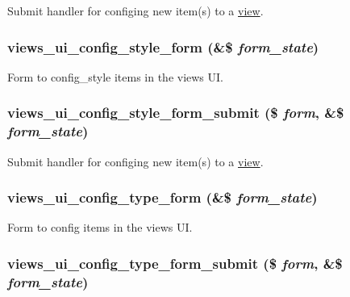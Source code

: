 Submit handler for configing new item(s) to a \hyperlink{classview}{view}. \hypertarget{admin_8inc_9cc05ea6bbc6009482ee71d374c4538e}{
\subsubsection[{views\_\-ui\_\-config\_\-style\_\-form}]{\setlength{\rightskip}{0pt plus 5cm}views\_\-ui\_\-config\_\-style\_\-form (\&\$ {\em form\_\-state})}}
\label{admin_8inc_9cc05ea6bbc6009482ee71d374c4538e}


Form to config\_\-style items in the views UI. \hypertarget{admin_8inc_421a319ebb088e20841e643f67ab1cfe}{
\subsubsection[{views\_\-ui\_\-config\_\-style\_\-form\_\-submit}]{\setlength{\rightskip}{0pt plus 5cm}views\_\-ui\_\-config\_\-style\_\-form\_\-submit (\$ {\em form}, \/  \&\$ {\em form\_\-state})}}
\label{admin_8inc_421a319ebb088e20841e643f67ab1cfe}


Submit handler for configing new item(s) to a \hyperlink{classview}{view}. \hypertarget{admin_8inc_bbebaee3c929f00492cf42bd8cb8db46}{
\subsubsection[{views\_\-ui\_\-config\_\-type\_\-form}]{\setlength{\rightskip}{0pt plus 5cm}views\_\-ui\_\-config\_\-type\_\-form (\&\$ {\em form\_\-state})}}
\label{admin_8inc_bbebaee3c929f00492cf42bd8cb8db46}


Form to config items in the views UI. \hypertarget{admin_8inc_61be3ab41a05febb0ec4c994beaf0b69}{
\subsubsection[{views\_\-ui\_\-config\_\-type\_\-form\_\-submit}]{\setlength{\rightskip}{0pt plus 5cm}views\_\-ui\_\-config\_\-type\_\-form\_\-submit (\$ {\em form}, \/  \&\$ {\em form\_\-state})}}
\label{admin_8inc_61be3ab41a05febb0ec4c994beaf0b69}


